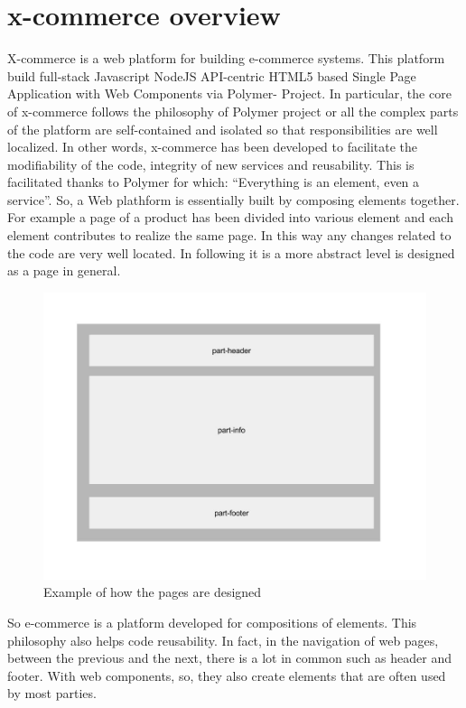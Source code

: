 \section{x-commerce overview}
\label{sec:x_commerce_overview}
X-commerce is a web platform for building e-commerce systems. This platform build full-stack Javascript NodeJS API-centric HTML5 based Single Page Application with Web Components via Polymer- Project.  In particular, the core of x-commerce follows the philosophy of Polymer project or all the complex parts of the platform are self-contained and isolated so that responsibilities are well localized. In other words, x-commerce has been developed to facilitate the modifiability of the code, integrity of new services and reusability. This is facilitated thanks to Polymer for which: “Everything is an element, even a service”.
So, a Web plathform is essentially built by composing elements together.
\newline
For example a page of a product has been divided into various element and each element contributes to realize the same page. In this way any changes related to the code are very well located. In following it is a more abstract level is designed as a page in general.
\begin{figure}[htb]
 \centering
 \includegraphics[width=1.0\linewidth]{images/chapter3/design-page.jpg}\hfill
 \caption[Design page]{Example of how the pages are designed}
 \label{fig:design_page}
\end{figure}
So e-commerce is a platform developed for compositions of elements. This philosophy also helps code reusability. In fact, in the navigation of web pages, between the previous and the next, there is a lot in common such as header and footer. With web components, so, they also create elements that are often used by most parties.
